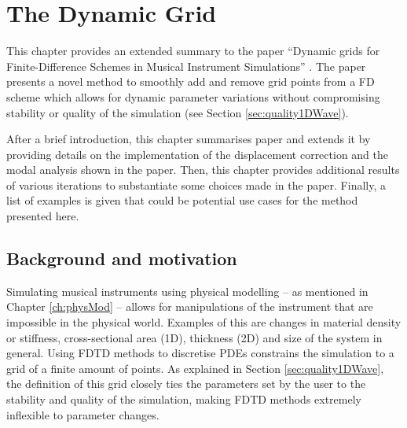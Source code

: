 \chapter{The Dynamic Grid}\label{ch:dynamicGrid}
This chapter provides an extended summary to the paper ``Dynamic grids for Finite-Difference Schemes in Musical Instrument Simulations'' \citeP[G]. The paper presents a novel method to smoothly add and remove grid points from a FD scheme which allows for dynamic parameter variations without compromising stability or quality of the simulation (see Section \ref{sec:quality1DWave}). 

After a brief introduction, this chapter summarises paper \citeP[G] and extends it by providing details on the implementation of the displacement correction and the modal analysis shown in the paper. Then, this chapter provides additional results of various iterations to substantiate some choices made in the paper. Finally, a list of examples is given that could be potential use cases for the method presented here. 

\section{Background and motivation}
Simulating musical instruments using physical modelling -- as mentioned in Chapter \ref{ch:physMod} -- allows for manipulations of the instrument that are impossible in the physical world. Examples of this are changes in material density or stiffness, cross-sectional area (1D), thickness (2D) and size of the system in general.  Using FDTD methods to discretise PDEs constrains the simulation to a grid of a finite amount of points. As explained in Section \ref{sec:quality1DWave}, the definition of this grid closely ties the parameters set by the user to the stability and quality of the simulation, making FDTD methods extremely inflexible to parameter changes. 

